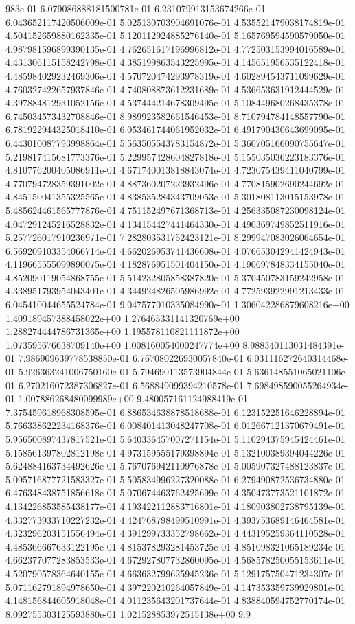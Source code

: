 983e-01	6.079086888181500781e-01	6.231079913153674266e-01	6.043652117420506009e-01	5.025130703904691076e-01	4.535521479038174819e-01	4.504152659880162335e-01	5.120112924885276140e-01	5.165769594590579050e-01	4.987981596899390135e-01	4.762651617196996812e-01	4.772503153994016589e-01	4.431306115158242798e-01	4.385199863543225995e-01	4.145651956535122418e-01	4.485984029232469306e-01	4.570720474293978319e-01	4.602894543711099629e-01	4.760327422657937846e-01	4.740808873612231689e-01	4.536653631912444529e-01	4.397884812931052156e-01	4.537444214678309495e-01	5.108449680268435378e-01	6.745034573432708846e-01	8.989923582661546453e-01	8.710794784148557790e-01	6.781922944325018410e-01	6.053461744061952032e-01	6.491790430643699095e-01	6.443010087793998864e-01	5.563505543783154872e-01	5.360705166090755647e-01	5.219817415681773376e-01	5.229957428604827818e-01	5.155035036223183376e-01	4.810776200405086911e-01	4.671740013818843074e-01	4.723075439411040799e-01	4.770794728359391002e-01	4.887360207223932496e-01	4.770815902690244692e-01	4.845150041355325565e-01	4.838535284343709053e-01	5.301808113015153978e-01	5.485624461565777876e-01	4.751152497671368713e-01	4.256335087230098124e-01	4.047291245216528832e-01	4.134154427441464330e-01	4.490369749852511916e-01	5.257726017910236971e-01	7.282803531752423121e-01	8.299947083026064654e-01	6.569209103354066714e-01	4.662026953741436608e-01	4.076653042941424943e-01	4.119665555099890075e-01	4.182876951501404150e-01	4.190697848334155040e-01	4.852090119054868755e-01	5.514232805858387820e-01	5.370450783159242958e-01	4.338951793954043401e-01	4.344924826505986992e-01	4.772593922991213433e-01	6.045410044655524784e-01	9.047577010335084990e-01	1.306042286879608216e+00	1.409189457388458022e+00	1.276465331141320769e+00	1.288274444786731365e+00	1.195578110821111872e+00	1.073595676638709140e+00	1.008160054000247774e+00	8.988340113031484391e-01	7.986909639778538850e-01	6.767080226930057840e-01	6.031116272640314468e-01	5.926363241006750160e-01	5.794690113573904844e-01	5.636148551065021106e-01	6.270216072387306827e-01	6.568849099394210578e-01	7.698498590055264934e-01	1.007886268480099989e+00	9.480057161124988419e-01	7.375459618968308595e-01	6.886534638878518688e-01	6.123152251646228894e-01	5.766338622234168376e-01	6.008401413048247708e-01	6.012667121370679491e-01	5.956500897437817521e-01	5.640336457007271154e-01	5.110294375945424461e-01	5.158561397802812198e-01	4.973159555179398894e-01	5.132100389394044226e-01	5.624884163734492626e-01	5.767076942110976878e-01	5.005907327488123837e-01	5.095716877721583327e-01	5.505834996227320088e-01	6.279490872536734880e-01	6.476348438751856618e-01	5.070674463762425699e-01	4.350473773521101872e-01	4.134226853585438177e-01	4.193422112883716801e-01	4.180903802738795139e-01	4.332773933710227232e-01	4.424768798499510991e-01	4.393753689146464581e-01	4.323296203151556494e-01	4.391299733352798662e-01	4.443195259364110528e-01	4.485366667633122195e-01	4.815378293281453725e-01	4.851098321065189234e-01	4.662377077283853533e-01	4.672927807732860095e-01	4.568578250055153611e-01	4.520790578364640155e-01	4.663632799625945236e-01	5.129175750471234307e-01	5.071162791894978650e-01	4.397220210264057849e-01	4.147353359739929801e-01	4.148156844605918048e-01	4.011235643201737644e-01	4.838840594752770174e-01	8.092755303125593880e-01	1.021528853972515138e+00	9.9